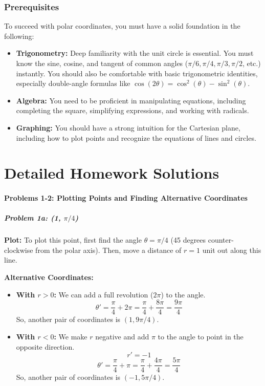 \documentclass{article}
\begin{document}
\section{Prerequisites}
To succeed with polar coordinates, you must have a solid foundation in the following:
\begin{itemize}
    \item \textbf{Trigonometry:} Deep familiarity with the unit circle is essential. You must know the sine, cosine, and tangent of common angles (\(\pi/6, \pi/4, \pi/3, \pi/2\), etc.) instantly. You should also be comfortable with basic trigonometric identities, especially double-angle formulas like \(\cos(2\theta) = \cos^2(\theta) - \sin^2(\theta)\).
    \item \textbf{Algebra:} You need to be proficient in manipulating equations, including completing the square, simplifying expressions, and working with radicals.
    \item \textbf{Graphing:} You should have a strong intuition for the Cartesian plane, including how to plot points and recognize the equations of lines and circles.
\end{itemize}

\part{Detailed Homework Solutions}

\subsection*{Problems 1-2: Plotting Points and Finding Alternative Coordinates}

\subsubsection*{Problem 1a: (1, \(\pi/4\))}
\textbf{Plot:} To plot this point, first find the angle \(\theta = \pi/4\) (45 degrees counter-clockwise from the polar axis). Then, move a distance of \(r=1\) unit out along this line.

\textbf{Alternative Coordinates:}
\begin{itemize}
    \item \textbf{With \(r > 0\):} We can add a full revolution (\(2\pi\)) to the angle.
    \[ \theta' = \frac{\pi}{4} + 2\pi = \frac{\pi}{4} + \frac{8\pi}{4} = \frac{9\pi}{4} \]
    So, another pair of coordinates is \((1, 9\pi/4)\).

    \item \textbf{With \(r < 0\):} We make \(r\) negative and add \(\pi\) to the angle to point in the opposite direction.
    \[ r' = -1 \]
    \[ \theta' = \frac{\pi}{4} + \pi = \frac{\pi}{4} + \frac{4\pi}{4} = \frac{5\pi}{4} \]
    So, another pair of coordinates is \((-1, 5\pi/4)\).
\end{itemize}
\end{document}
